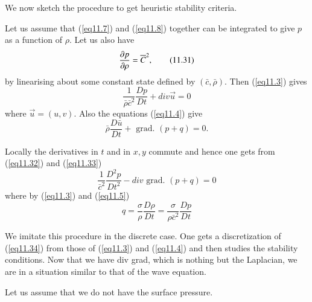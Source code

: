 We now sketch the procedure to get heuristic stability criteria.

Let us assume that (\ref{eq11.7}) and (\ref{eq11.8}) together can be
integrated to give $p$ as a function of $\rho$. Let us also have  
\begin{equation*}
\frac{\partial p}{\partial \rho} = \overline{C}^2,\tag{11.31}\label{eq11.31}
\end{equation*}
by linearising about some constant state defined by $(\bar{c},
\bar{\rho})$. Then (\ref{eq11.3}) gives  
\begin{equation*}
\frac{1}{\bar{\rho} \bar{c}^2} \frac{Dp}{Dt} + div \vec{u} = 0
\tag{11.32}\label{eq11.32}
\end{equation*}\pageoriginale 
where $\vec{u} = (u,v)$. Also the equations (\ref{eq11.4}) give 
\begin{equation*}
\bar{\rho} \frac{D\bar{u}}{Dt} + \text{ grad. } (p+q) = 0. 
\tag{11.33}\label{eq11.33}
\end{equation*}

Locally the derivatives in $t$ and in $x, y$ commute and hence one
gets from (\ref{eq11.32}) and (\ref{eq11.33}) 
\begin{equation*}
\frac{1}{\bar{c}^2} \frac{D^2 p}{Dt^2} - div \text{ grad. } (p+q)  = 0
\tag{11.34}\label{eq11.34}
\end{equation*}
where by (\ref{eq11.3}) and (\ref{eq11.5})
\begin{equation*}
q = \frac{\sigma}{\rho}  \frac{D\rho}{Dt} = \frac{\sigma}{\rho \bar{c}^2} \frac{Dp}{Dt} \tag{11.35}\label{eq11.35}
\end{equation*}

We imitate this procedure in the discrete case. One gets a discretization of (\ref{eq11.34}) from those of (\ref{eq11.3}) and (\ref{eq11.4}) and then studies the stability conditions. Now that we have div grad, which is nothing but the Laplacian, we are in a situation similar to that of the wave equation.

Let us assume that we do not have the surface pressure.


